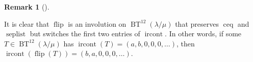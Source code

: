 \documentclass[numbers=enddot,12pt,final,onecolumn,notitlepage]{scrartcl}%
\theoremstyle{definition}
\newtheorem{remk}[theo]{Remark}
\newenvironment{remark}[1][]
{\begin{remk}[#1]\begin{leftbar}}
{\end{leftbar}\end{remk}}
\def\ircont{{\operatorname{ircont}}}
\def\BenignTables{{\operatorname{BT}^{12}\left(  \lambda/\mu\right)}}
\begin{document}
\begin{comment}
For example,
\[
\text{if } T \text { is }
\ytableausetup{notabloids}
\begin{ytableau}
\none& 1 & 1 & 2 & 1 \\
1 & 1 & 1 \\
1 & 2 & 1 \\
1 & 2 \\
2
\end{ytableau}
\text{ , then }\operatorname*{flip}\left(  T\right)\text{ is }
\ytableausetup{notabloids}
\begin{ytableau}
\none& 1 & 2 & 1 & 2 \\
1 & 1 & 2 \\
1 & 2 & 2 \\
1 & 2 \\
2
\end{ytableau}
.
\]

\end{comment}

\begin{remark}
 \label{pf.lem.BK.flip.ircont}
It is clear that $\operatorname*{flip}$ is an involution on $\BenignTables$ that preserves $\operatorname*{ceq}$ and $\operatorname*{seplist}$ but switches the first two entries of $\operatorname*{ircont}$. In other words, if some $T \in \BenignTables$ has $\ircont\left(T\right) = \left(a,b,0,0,0,\ldots\right)$, then
$\operatorname{ircont}\left(\operatorname{flip}\left(T\right)\right) = \left(b,a,0,0,0,\ldots\right)$.
\end{remark}
\end{document}
